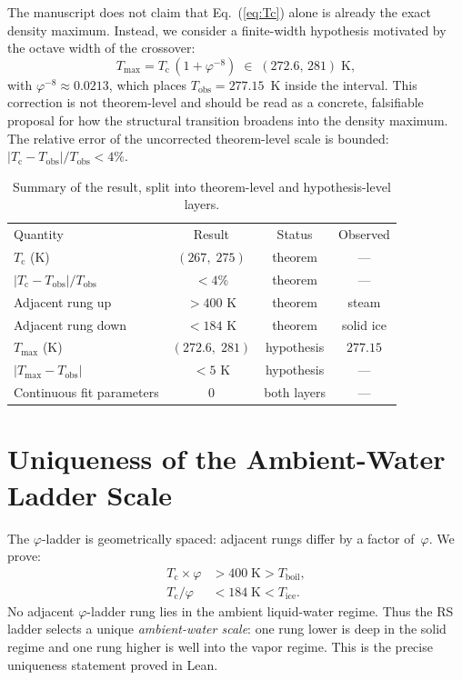 \documentclass[aps,prl,twocolumn,superscriptaddress,showpacs,floatfix]{revtex4-2}
\newcommand{\Tc}{T_{\mathrm{c}}}
\newcommand{\Tobs}{T_{\mathrm{obs}}}
\newcommand{\Tmax}{T_{\mathrm{max}}}
\newcommand{\phig}{\varphi}
\begin{document}
The manuscript does not claim that Eq.~(\ref{eq:Tc}) alone is already the exact density maximum.
Instead, we consider a finite-width hypothesis motivated by the octave width of the crossover:
\begin{equation}
  \Tmax = \Tc\,(1 + \phig^{-8}) \;\in\; (272.6,\, 281)\;\text{K},
  \label{eq:Tmax}
\end{equation}
with $\phig^{-8} \approx 0.0213$, which places $\Tobs = 277.15$~K inside the interval.
This correction is not theorem-level and should be read as a concrete, falsifiable proposal for how the structural transition broadens into the density maximum.
The relative error of the uncorrected theorem-level scale is bounded: $|\Tc - \Tobs|/\Tobs < 4\%$.

\begin{table}[t]
\caption{Summary of the result, split into theorem-level and hypothesis-level layers.}
\label{tab:summary}
\begin{ruledtabular}
\small
\begin{tabular}{lccc}
\textrm{Quantity} & \textrm{Result} & \textrm{Status} & \textrm{Observed} \\
\colrule
$\Tc$ (K) & $(267,\; 275)$ & theorem & --- \\
$|\Tc-\Tobs|/\Tobs$ & $< 4\%$ & theorem & --- \\
Adjacent rung up & $> 400$ K & theorem & steam \\
Adjacent rung down & $< 184$ K & theorem & solid ice \\
$\Tmax$ (K) & $(272.6,\;281)$ & hypothesis & $277.15$ \\
$|\Tmax-\Tobs|$ & $< 5$ K & hypothesis & --- \\
Continuous fit parameters & 0 & both layers & --- \\
\end{tabular}
\end{ruledtabular}
\end{table}

\section{Uniqueness of the Ambient-Water Ladder Scale}

The $\phig$-ladder is geometrically spaced: adjacent rungs differ by a factor of~$\phig$.
We prove:
\begin{align}
  \Tc \times \phig &> 400\;\text{K} > T_{\mathrm{boil}}, \label{eq:up} \\
  \Tc / \phig &< 184\;\text{K} < T_{\mathrm{ice}}. \label{eq:down}
\end{align}
No adjacent $\phig$-ladder rung lies in the ambient liquid-water regime.
Thus the RS ladder selects a unique \emph{ambient-water scale}: one rung lower is deep in the solid regime and one rung higher is well into the vapor regime.
This is the precise uniqueness statement proved in Lean.
\end{document}
